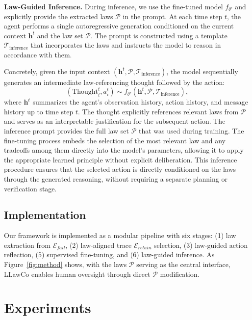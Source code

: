 \documentclass{article}
\theoremstyle{plain}
\theoremstyle{definition}
\theoremstyle{remark}
\newcommand{\name}{LLawCo\xspace}
\begin{document}
\textbf{Law-Guided Inference.} 
During inference, we use the fine-tuned model $f_{\theta'}$ and explicitly provide the extracted laws $\mathcal{P}$ in the prompt. At each time step $t$, the agent performs a single autoregressive generation conditioned on the current context $\mathbf{h}^t$ and the law set $\mathcal{P}$. The prompt is constructed using a template $\mathcal{T}_{\text{inference}}$ that incorporates the laws and instructs the model to reason in accordance with them.

Concretely, given the input context $(\mathbf{h}^t, \mathcal{P}, \mathcal{T}_{\text{inference}})$, the model sequentially generates an intermediate law-referencing thought followed by the action:
\begin{equation}
(\text{Thought}_i^t, a_i^t) \sim f_{\theta'}(\mathbf{h}^t, \mathcal{P}, \mathcal{T}_{\text{inference}}),
\end{equation}
where $\mathbf{h}^t$ summarizes the agent’s observation history, action history, and message history up to time step $t$. The thought explicitly references relevant laws from $\mathcal{P}$ and serves as an interpretable justification for the subsequent action. The inference prompt provides the full law set $\mathcal{P}$ that was used during training. The fine-tuning process embeds the selection of the most relevant law and any tradeoffs among them directly into the model's parameters, allowing it to apply the appropriate learned principle without explicit deliberation. This inference procedure ensures that the selected action is directly conditioned on the laws through the generated reasoning, without requiring a separate planning or verification stage.

\subsection{Implementation}

Our framework is implemented as a modular pipeline with six stages: (1) law extraction from $\mathcal{E}_{fail}$, (2) law-aligned trace $\mathcal{E}_{retain}$ selection, (3) law-guided action reflection, (5) supervised fine-tuning, and (6) law-guided inference. As Figure~\ref{fig:method} shows, with the laws $\mathcal{P}$ serving as the central interface, \name enables human oversight through direct $\mathcal{P}$ modification.

\section{Experiments}
\end{document}
